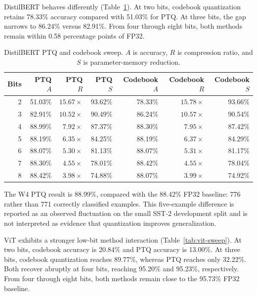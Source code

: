 \documentclass[conference]{IEEEtran}
\begin{document}
DistilBERT behaves differently (Table~\ref{tab:distilbert-sweep}). At two bits, codebook quantization retains 78.33\% accuracy compared with 51.03\% for PTQ. At three bits, the gap narrows to 86.24\% versus 82.91\%. From four through eight bits, both methods remain within 0.58 percentage points of FP32.

\begin{table}[t]
\caption{DistilBERT PTQ and codebook sweep. $A$ is accuracy, $R$ is compression ratio, and $S$ is parameter-memory reduction.}
\label{tab:distilbert-sweep}
\centering
\small
\begin{tabular}{@{}rrrrrrr@{}}
\toprule
Bits & PTQ $A$ & PTQ $R$ & PTQ $S$ & Codebook $A$ & Codebook $R$ & Codebook $S$ \\
\midrule
2 & 51.03\% & $15.67\times$ & 93.62\% & 78.33\% & $15.78\times$ & 93.66\% \\
3 & 82.91\% & $10.52\times$ & 90.49\% & 86.24\% & $10.57\times$ & 90.54\% \\
4 & 88.99\% & $7.92\times$ & 87.37\% & 88.30\% & $7.95\times$ & 87.42\% \\
5 & 88.19\% & $6.35\times$ & 84.25\% & 88.19\% & $6.37\times$ & 84.29\% \\
6 & 88.07\% & $5.30\times$ & 81.13\% & 88.07\% & $5.31\times$ & 81.17\% \\
7 & 88.30\% & $4.55\times$ & 78.01\% & 88.42\% & $4.55\times$ & 78.04\% \\
8 & 88.42\% & $3.98\times$ & 74.88\% & 88.07\% & $3.99\times$ & 74.92\% \\
\bottomrule
\end{tabular}
\end{table}

The W4 PTQ result is 88.99\%, compared with the 88.42\% FP32 baseline: 776 rather than 771 correctly classified examples. This five-example difference is reported as an observed fluctuation on the small SST-2 development split and is not interpreted as evidence that quantization improves generalization.

ViT exhibits a stronger low-bit method interaction (Table~\ref{tab:vit-sweep}). At two bits, codebook accuracy is 20.84\% and PTQ accuracy is 13.00\%. At three bits, codebook quantization reaches 89.77\%, whereas PTQ reaches only 32.22\%. Both recover abruptly at four bits, reaching 95.20\% and 95.23\%, respectively. From four through eight bits, both methods remain close to the 95.73\% FP32 baseline.
\end{document}
